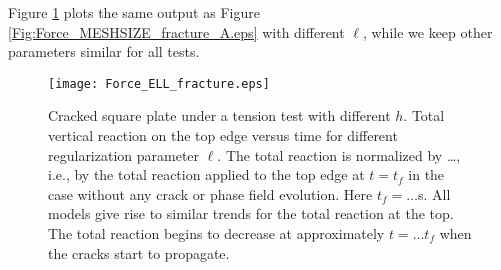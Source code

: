Figure \ref{Fig:Force_Ell_fracture_A.eps} plots the same output as Figure \ref{Fig:Force_MESHSIZE_fracture_A.eps} with different $\ell$, while we keep other parameters similar for all tests.
\begin{figure}[htbp]
    \centering
    \texttt{[image: Force\_ELL\_fracture.eps]}
    \caption{{Cracked square plate under a tension test with different $h$.} Total vertical reaction on the top edge versus time for different regularization parameter $\ell$. The total reaction is normalized by \dots, i.e., by the total reaction applied to the top edge at $t=t_f$ in the case without any crack or phase field evolution. {Here $t_f=\dots$s.}
    All models give rise to similar trends for the total reaction at the top. The total reaction begins to decrease at approximately $t=\dots t_f$ when the cracks start to propagate.}
    \label{Fig:Force_Ell_fracture_A.eps}
\end{figure}















